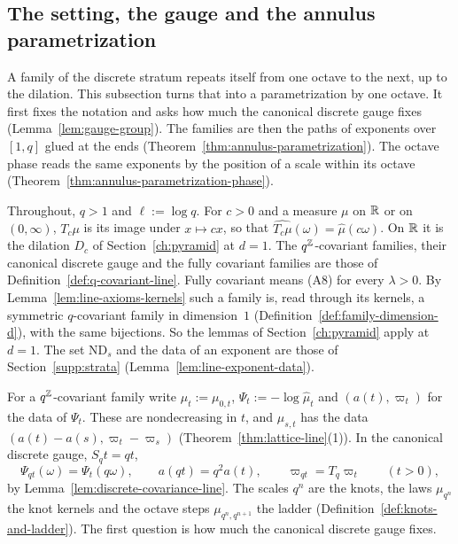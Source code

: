 \subsection{The setting, the gauge and the annulus parametrization}
\label{sec:line-annulus}

A family of the discrete stratum repeats itself from one octave to the next, up to the dilation. This
subsection turns that into a parametrization by one octave. It first fixes the notation and asks how
much the canonical discrete gauge fixes (Lemma~\ref{lem:gauge-group}). The families are then the
paths of exponents over $[1,q]$ glued at the ends (Theorem~\ref{thm:annulus-parametrization}). The
octave phase reads the same exponents by the position of a scale within its octave
(Theorem~\ref{thm:annulus-parametrization-phase}).

Throughout, $q > 1$ and $\ell := \log q$. For $c > 0$ and a measure $\mu$ on $\mathbb{R}$ or on
$(0,\infty)$, $T_c\mu$ is its image under $x \mapsto cx$, so that
$\widehat{T_c\mu}(\omega) = \widehat\mu(c\omega)$. On $\mathbb{R}$ it is the dilation $D_c$ of
Section~\ref{ch:pyramid} at $d = 1$. The $q^{\mathbb{Z}}$-covariant families, their canonical discrete
gauge and the fully covariant families are those of Definition~\ref{def:q-covariant-line}. Fully
covariant means (A8) for every $\lambda > 0$. By Lemma~\ref{lem:line-axioms-kernels} such a family
is, read through its kernels, a symmetric $q$-covariant family in dimension~$1$
(Definition~\ref{def:family-dimension-d}), with the same bijections. So the lemmas of
Section~\ref{ch:pyramid} apply at $d = 1$. The set $\mathrm{ND}_s$ and the data of an exponent are
those of Section~\ref{supp:strata} (Lemma~\ref{lem:line-exponent-data}).

For a $q^{\mathbb{Z}}$-covariant family write $\mu_t := \mu_{0,t}$, $\Psi_t := -\log\widehat\mu_t$ and
$(a(t), \varpi_t)$ for the data of $\Psi_t$. These are nondecreasing in $t$, and $\mu_{s,t}$ has the
data $(a(t) - a(s), \varpi_t - \varpi_s)$ (Theorem~\ref{thm:lattice-line}(1)). In the canonical
discrete gauge, $S_qt = qt$,
\[
  \Psi_{qt}(\omega) = \Psi_t(q\omega), \qquad a(qt) = q^2a(t), \qquad \varpi_{qt} = T_q\varpi_t
  \qquad (t > 0),
\]
by Lemma~\ref{lem:discrete-covariance-line}. The scales $q^n$ are the knots, the laws
$\mu_{q^n}$ the knot kernels and the octave steps $\mu_{q^n,q^{n+1}}$ the ladder
(Definition~\ref{def:knots-and-ladder}). The first question is how much the canonical discrete
gauge fixes.

